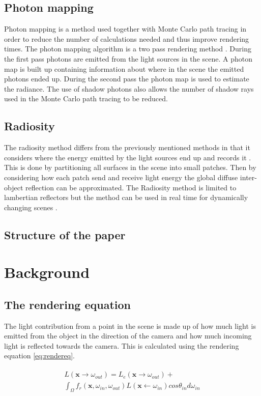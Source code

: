 \documentclass[twocolumn]{article}
\begin{document}
\subsection{Photon mapping}
Photon mapping is a method used together with Monte Carlo path tracing in order to reduce the number of calculations needed and thus improve rendering times. The photon mapping algorithm is a two pass rendering method \cite{jensen}. During the first pass photons are emitted from the light sources in the scene. A photon map is built up containing information about where in the scene the emitted photons ended up. During the second pass the photon map is used to estimate the radiance. The use of shadow photons also allows the number of shadow rays used in the Monte Carlo path tracing to be reduced.

\subsection{Radiosity}
The radiosity method differs from the previously mentioned methods in that it considers where the energy emitted by the light sources end up and records it \cite{CG:PP}. This is done by partitioning all surfaces in the scene into small patches. Then by considering how each patch send and receive light energy the global diffuse inter-object reflection can be approximated. The Radiosity method is limited to lambertian reflectors but the method can be used in real time for dynamically changing scenes \cite{Rfb}.

\subsection{Structure of the paper}

\section{Background}

\subsection{The rendering equation}

The light contribution from a point in the scene is made up of how much light is emitted from the object in the direction of the camera and how much incoming light is reflected towards the camera. This is calculated using the rendering equation \ref{eq:rendereq}.

\begin{align}
\label{eq:rendereq}
\begin{split}
	 L(\mathbf{x} \rightarrow \omega_{out}) = L_e(\mathbf{x} \rightarrow \omega_{out}) + \\ \int_{\Omega} f_r(\mathbf{x}, \omega_{in}, \omega_{out})L(\mathbf{x} \leftarrow \omega_{in})cos\theta_{in}d\omega_{in}
\end{split}
\end{align}
\end{document}
